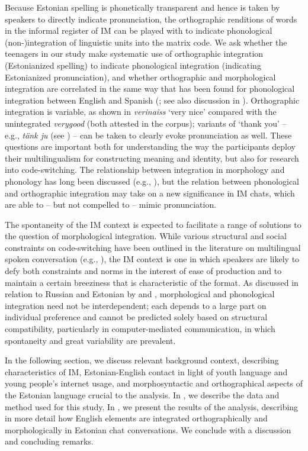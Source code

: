 \documentclass[output=paper]{langscibook}
\begin{document}
Because Estonian spelling is phonetically transparent and hence is taken by speakers to directly indicate pronunciation, the orthographic renditions of words in the informal register of IM can be played with to indicate phonological (non-)integration of linguistic units into the matrix code. We ask whether the teenagers in our study make systematic use of orthographic integration (Estonianized spelling) to indicate phonological integration (indicating Estonianized pronunciation), and whether orthographic and morphological integration are correlated in the same way that has been found for phonological integration between English and Spanish (\citealt{Bessett2017}; see also discussion in \citealt{Deuchar2020}). Orthographic integration is variable, as shown in \textit{verinaiss} ‘very nice’ compared with the unintegrated \textit{verygood} (both attested in the corpus); variants of ‘thank you’ – e.g., \textit{tänk ju} (see ) – can be taken to clearly evoke pronunciation as well. These questions are important both for understanding the way the participants deploy their multilingualism for constructing meaning and identity, but also for research into code-switching. The relationship between integration in morphology and phonology has long been discussed (e.g., \citealt{Poplack1980}), but the relation between phonological and orthographic integration may take on a new significance in IM chats, which are able to – but not compelled to – mimic pronunciation.

The spontaneity of the IM context is expected to facilitate a range of solutions to the question of morphological integration. While various structural and social constraints on code-switching have been outlined in the literature on multilingual spoken conversation (e.g., \citealt{Myers-Scotton2006}), the IM context is one in which speakers are likely to defy both constraints and norms in the interest of ease of production and to maintain a certain breeziness that is characteristic of the format. As discussed in relation to Russian and Estonian by \citet{Verschik2007,Verschik2016} and \citet{ZabrodskajaVerschik2014}, morphological and phonological integration need not be interdependent; each depends to a large part on individual preference and cannot be predicted solely based on structural compatibility, particularly in computer-mediated communication, in which spontaneity and great variability are prevalent.

In the following section, we discuss relevant background context, describing characteristics of IM, Estonian-English contact in light of youth language and young people’s internet usage, and morphosyntactic and orthographical aspects of the Estonian language crucial to the analysis. In , we describe the data and method used for this study. In , we present the results of the analysis, describing in more detail how English elements are integrated orthographically and morphologically in Estonian chat conversations. We conclude with a discussion and concluding remarks.
\end{document}
